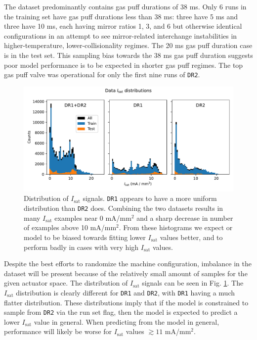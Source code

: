 The dataset predominantly contains gas puff durations of 38 ms. Only 6 runs in the training set have gas puff durations less than 38 ms: three have 5 ms and three have 10 ms, each having mirror ratios 1, 3, and 6 but otherwise identical configurations in an attempt to see mirror-related interchange instabilities in higher-temperature, lower-collisionality regimes. The 20 ms gas puff duration case is in the test set. This sampling bias towards the 38 ms gas puff duration suggests poor model performance is to be expected in shorter gas puff regimes. The top gas puff valve was operational for only the first nine runs of \texttt{DR2}.

\begin{figure}
	\centering
	\includegraphics[width=\linewidth]{figures/PP1_02_isat_distribution.pdf}
	\caption[Time-averaged $I_\text{sat}$ distribution over shots]{\label{fig:PP1_02_isat_distribution}Distribution of $I_\text{sat}$ signals. \texttt{DR1} appears to have a more uniform distribution than \texttt{DR2} does. Combining the two datasets results in many $I_\text{sat}$ examples near 0 mA/mm$^2$ and a sharp decrease in number of examples above 10 mA/mm$^2$. From these histograms we expect or model to be biased towards fitting lower $I_\text{sat}$ values better, and to perform badly in cases with very high $I_\text{sat}$ values.}
\end{figure}

Despite the best efforts to randomize the machine configuration, imbalance in the dataset will be present because of the relatively small amount of samples for the given actuator space. The distribution of $I_\text{sat}$ signals can be seen in Fig. \ref{fig:PP1_02_isat_distribution}. The $I_\text{sat}$ distribution is clearly different for \texttt{DR1} and \texttt{DR2}, with \texttt{DR1} having a much flatter distribution. These distributions imply that if the model is constrained to sample from \texttt{DR2} via the run set flag, then the model is expected to predict a lower $I_\text{sat}$ value in general. When predicting from the model in general, performance will likely be worse for $I_\text{sat}$ values $\gtrsim 11$ mA/mm$^2$. 

